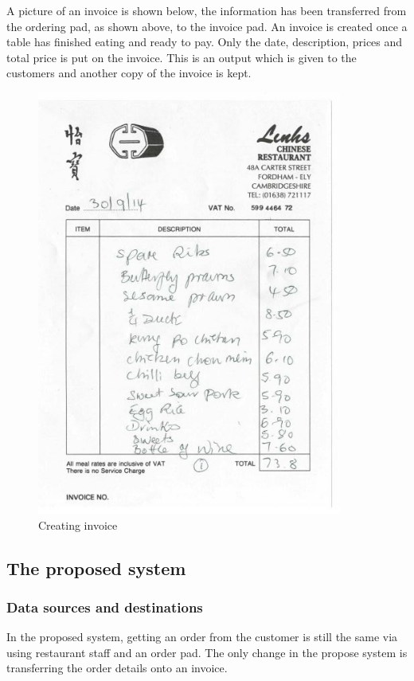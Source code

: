 \newpage
A picture of an invoice is shown below, the information has been transferred from the ordering pad, as shown above, to the invoice pad. An invoice is created once a table has finished eating and ready to pay. Only the date, description, prices and total price is put on the invoice. This is an output which is given to the customers and another copy of the invoice is kept.

\begin{figure}[H]
    \includegraphics[height = 14cm]{./Analysis/Invoice}
    \caption{Creating invoice} \label{fig:invoice}
\end{figure}

\subsection{The proposed system}

\subsubsection{Data sources and destinations}

In the proposed system, getting an order from the customer is still the same via using restaurant staff and an order pad. The only change in the propose system is transferring the order details onto an invoice. 

